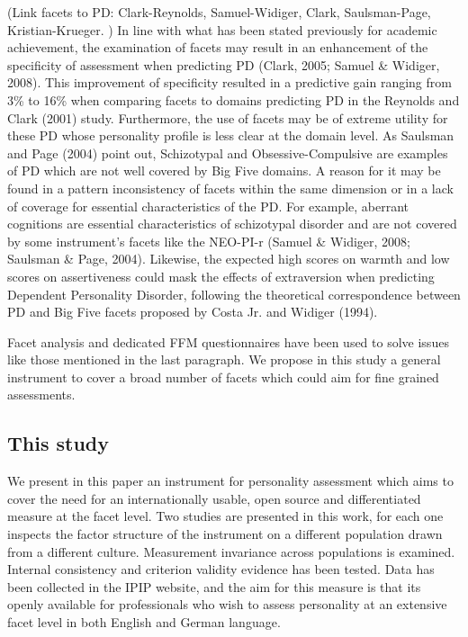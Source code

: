 \documentclass[man]{apa6}
\theoremstyle{definition}
\theoremstyle{definition}
\theoremstyle{definition}
\theoremstyle{remark}
\begin{document}
(Link facets to PD: Clark-Reynolds, Samuel-Widiger, Clark,
Saulsman-Page, Kristian-Krueger. ) In line with what has been stated
previously for academic achievement, the examination of facets may
result in an enhancement of the specificity of assessment when
predicting PD (Clark, 2005; Samuel \& Widiger, 2008). This improvement
of specificity resulted in a predictive gain ranging from 3\% to 16\%
when comparing facets to domains predicting PD in the Reynolds and Clark
(2001) study. Furthermore, the use of facets may be of extreme utility
for these PD whose personality profile is less clear at the domain
level. As Saulsman and Page (2004) point out, Schizotypal and
Obsessive-Compulsive are examples of PD which are not well covered by
Big Five domains. A reason for it may be found in a pattern
inconsistency of facets within the same dimension or in a lack of
coverage for essential characteristics of the PD. For example, aberrant
cognitions are essential characteristics of schizotypal disorder and are
not covered by some instrument's facets like the NEO-PI-r (Samuel \&
Widiger, 2008; Saulsman \& Page, 2004). Likewise, the expected high
scores on warmth and low scores on assertiveness could mask the effects
of extraversion when predicting Dependent Personality Disorder,
following the theoretical correspondence between PD and Big Five facets
proposed by Costa Jr. and Widiger (1994).

Facet analysis and dedicated FFM questionnaires have been used to solve
issues like those mentioned in the last paragraph. We propose in this
study a general instrument to cover a broad number of facets which could
aim for fine grained assessments.

\hypertarget{this-study}{%
\subsection{This study}\label{this-study}}

We present in this paper an instrument for personality assessment which
aims to cover the need for an internationally usable, open source and
differentiated measure at the facet level. Two studies are presented in
this work, for each one inspects the factor structure of the instrument
on a different population drawn from a different culture. Measurement
invariance across populations is examined. Internal consistency and
criterion validity evidence has been tested. Data has been collected in
the IPIP website, and the aim for this measure is that its openly
available for professionals who wish to assess personality at an
extensive facet level in both English and German language.
\end{document}
